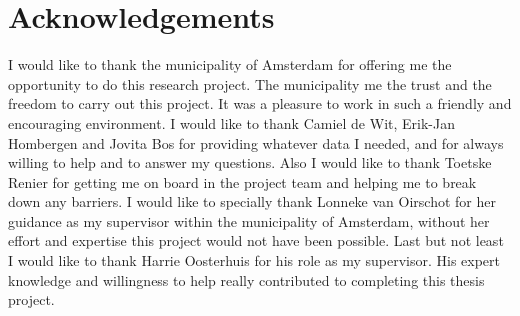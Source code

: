 \documentclass[10pt, sigconf, format=acmsmall, screen=true, review=false]{acmart}
\begin{document}
\section*{Acknowledgements}
I would like to thank the municipality of Amsterdam for offering me the opportunity to do this research project. 
The municipality me the trust and the freedom to carry out this project.
It was a pleasure to work in such a friendly and encouraging environment.
I would like to thank Camiel de Wit, Erik-Jan Hombergen and Jovita Bos for providing whatever data I needed, and for always willing to help and to answer my questions. 
Also I would like to thank Toetske Renier for getting me on board in the project team and helping me to break down any barriers. 
I would like to specially thank Lonneke van Oirschot for her guidance as my supervisor within the municipality of Amsterdam, without her effort and expertise this project would not have been possible. 
Last but not least I would like to thank Harrie Oosterhuis for his role as my supervisor. 
His expert knowledge and willingness to help really contributed to completing this thesis project.




\pagebreak
\onecolumn
\appendix



 
\end{document}
